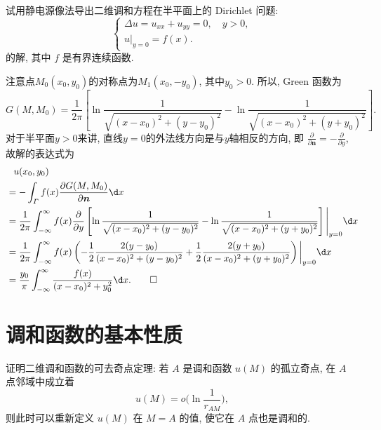 \begin{exercise}
  试用静电源像法导出二维调和方程在半平面上的 Dirichlet 问题:
  \[\begin{cases}
    \Delta u = u_{xx} + u_{yy} = 0, \quad y>0, \\
    u|_{y=0} = f(x).
  \end{cases}\]
  的解, 其中 $f$ 是有界连续函数.
\end{exercise}

\begin{solve}
  注意点$M_0(x_0,y_0)$的对称点为$M_1(x_0,-y_0)$, 其中$y_0>0$. 所以, Green 函数为
  \[G(M,M_0) = \frac{1}{2\pi} \left[\ln\frac{1}{\sqrt{(x-x_0)^2+(y-y_0)^2}}
      - \ln\frac{1}{\sqrt{(x-x_0)^2+(y+y_0)^2}}\right]. \]
  对于半平面$y>0$来讲, 直线$y=0$的外法线方向是与$y$轴相反的方向, 即 $\displaystyle\frac{\partial}{\partial\bm{n}} = - \frac{\partial}{\partial y}$, 故解的表达式为
  \begin{align*}
  & \phantom{=} u(x_0,y_0) \\
  & = -\int_{\varGamma}f(x) \frac{\partial G(M,M_0)}{\partial\bm{n}} \d x \\
  & = \frac{1}{2\pi} \int_{-\infty}^{\infty}f(x) \frac{\partial}{\partial y}
      \left[\ln\frac{1}{\sqrt{(x-x_0)^2+(y-y_0)^2}}-\ln\frac{1}{\sqrt{(x-x_0)^2+(y+y_0)^2}}\right]
      \Bigg|_{y=0} \d x \\
  & = \frac{1}{2\pi} \int_{-\infty}^{\infty} f(x)
      \left(-\frac{1}{2} \frac{2(y-y_0)}{(x-x_0)^2+(y-y_0)^2}
        + \frac{1}{2} \frac{2(y+y_0)}{(x-x_0)^2+(y+y_0)^2}\right)\bigg|_{y=0} \d x \\
  & = \frac{y_0}{\pi}\int_{-\infty}^{\infty}\frac{f(x)}{(x-x_0)^2+y_0^2} \d x.\qedhere
  \end{align*}
\end{solve}


\section{调和函数的基本性质}

\begin{exercise}[2]
	证明二维调和函数的可去奇点定理:
	若 $A$ 是调和函数 $u(M)$ 的孤立奇点, 在 $A$ 点邻域中成立着
	\begin{equation}
		u(M) = o\biggl(\ln\frac{1}{r_{AM}}\biggr), \tag{$\star$}
	\end{equation}
	则此时可以重新定义 $u(M)$ 在 $M=A$ 的值, 使它在 $A$ 点也是调和的.
\end{exercise}

